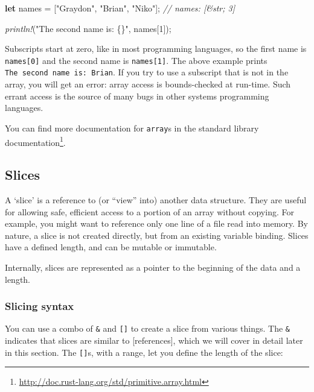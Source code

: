 \documentclass[a4paper,]{book}
\newenvironment{Shaded}{\begin{snugshade}}{\end{snugshade}}
\newcommand{\KeywordTok}[1]{\textcolor[rgb]{0.13,0.29,0.53}{\textbf{{#1}}}}
\newcommand{\DecValTok}[1]{\textcolor[rgb]{0.00,0.00,0.81}{{#1}}}
\newcommand{\StringTok}[1]{\textcolor[rgb]{0.31,0.60,0.02}{{#1}}}
\newcommand{\CommentTok}[1]{\textcolor[rgb]{0.56,0.35,0.01}{\textit{{#1}}}}
\newcommand{\PreprocessorTok}[1]{\textcolor[rgb]{0.56,0.35,0.01}{\textit{{#1}}}}
\newcommand{\NormalTok}[1]{{#1}}
\renewcommand{\href}[2]{#2\footnote{\url{#1}}}
\begin{document}
\begin{Shaded}
\begin{Highlighting}[]
\KeywordTok{let} \NormalTok{names = [}\StringTok{"Graydon"}\NormalTok{, }\StringTok{"Brian"}\NormalTok{, }\StringTok{"Niko"}\NormalTok{]; }\CommentTok{// names: [&str; 3]}

\PreprocessorTok{println!}\NormalTok{(}\StringTok{"The second name is: \{\}"}\NormalTok{, names[}\DecValTok{1}\NormalTok{]);}
\end{Highlighting}
\end{Shaded}

Subscripts start at zero, like in most programming languages, so the
first name is \texttt{names{[}0{]}} and the second name is
\texttt{names{[}1{]}}. The above example prints
\texttt{The\ second\ name\ is:\ Brian}. If you try to use a subscript
that is not in the array, you will get an error: array access is
bounds-checked at run-time. Such errant access is the source of many
bugs in other systems programming languages.

You can find more documentation for \texttt{array}s
\href{http://doc.rust-lang.org/std/primitive.array.html}{in the standard
library documentation}.

\subsection{Slices}\label{slices}

A `slice' is a reference to (or ``view'' into) another data structure.
They are useful for allowing safe, efficient access to a portion of an
array without copying. For example, you might want to reference only one
line of a file read into memory. By nature, a slice is not created
directly, but from an existing variable binding. Slices have a defined
length, and can be mutable or immutable.

Internally, slices are represented as a pointer to the beginning of the
data and a length.

\subsubsection{Slicing syntax}\label{slicing-syntax}

You can use a combo of \texttt{\&} and \texttt{{[}{]}} to create a slice
from various things. The \texttt{\&} indicates that slices are similar
to {[}references{]}, which we will cover in detail later in this
section. The \texttt{{[}{]}}s, with a range, let you define the length
of the slice:
\end{document}
